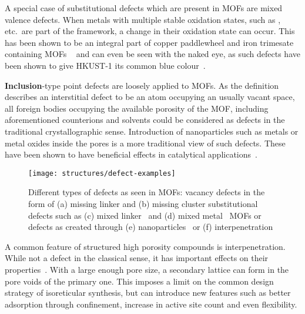 A special case of substitutional defects which are present in MOFs
are mixed valence defects. When metals with multiple stable oxidation
states, such as ,  etc.\ are part of
the framework, a change in their oxidation state can occur. This has
been shown to be an integral part of copper paddlewheel and
iron trimesate containing MOFs
~\cite{yoonControlledReducibilityMetalOrganic2010} and can even be
seen with the naked eye, as such defects have been shown
to give HKUST-1 its common blue colour~\cite{mullerDefectsColorCenters2017}.

\textbf{Inclusion}-type point defects are loosely applied to MOFs.
As the definition describes an interstitial defect
to be an atom occupying an usually vacant space, all foreign
bodies occupying the available porosity of the MOF, including
aforementioned counterions and solvents could be considered as
defects in the traditional crystallographic sense.
Introduction of nanoparticles such as metals or metal oxides
inside the pores is a more traditional view of such defects.
These have been shown to have beneficial
effects in catalytical
applications~\cite{falcaroApplicationMetalMetal2016, %
    schroderRutheniumNanoparticlesPorous2008}.

\begin{figure}[tb]
	\centering

	\texttt{[image: structures/defect-examples]}
	\caption{
		Different types of defects as seen in MOFs: 
		vacancy defects in the form of (a) missing linker and 
		(b) missing cluster substitutional defects such as
		(c) mixed linker~\cite{buekenTacklingDefectConundrum2017}
		and (d) mixed metal~\cite{vuongSynthesisEngineeringPorosity2013} MOFs or defects 
		as created through (e) nanoparticles~\cite{schroderRutheniumNanoparticlesPorous2008}
		or (f) interpenetration~\cite{yaoInterpenetratedMetalOrganic2012}
	}%
	\label{def:fgr:defect-types}
\end{figure}

A common feature of structured high porosity compounds is
interpenetration. While not a defect in the classical sense,
it has important effects on their 
properties~\cite{haldarInterpenetrationCoordinationPolymers2015}.
With a large enough pore size, a secondary lattice can form in the
pore voids of the primary one. This imposes a limit on the
common design strategy of isoreticular synthesis, but can
introduce new features such as better adsorption through
confinement, increase in active site count and even flexibility.

